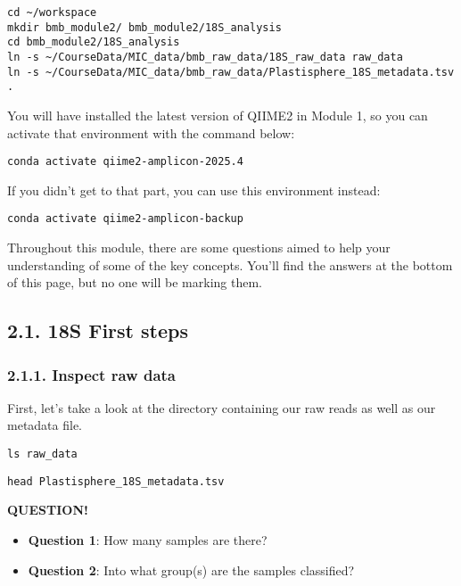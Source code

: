 \documentclass[
]{book}
\providecommand{\tightlist}{%
  \setlength{\itemsep}{0pt}\setlength{\parskip}{0pt}}
\newenvironment{bluebox}{
  \definecolor{shadecolor}{RGB}{172, 210, 237}
  \color{white}
  \begin{shaded}}
 {\end{shaded}}
\begin{document}
\begin{verbatim}
cd ~/workspace
mkdir bmb_module2/ bmb_module2/18S_analysis
cd bmb_module2/18S_analysis
ln -s ~/CourseData/MIC_data/bmb_raw_data/18S_raw_data raw_data
ln -s ~/CourseData/MIC_data/bmb_raw_data/Plastisphere_18S_metadata.tsv .
\end{verbatim}

You will have installed the latest version of QIIME2 in Module 1, so you can activate that environment with the command below:

\begin{verbatim}
conda activate qiime2-amplicon-2025.4
\end{verbatim}

If you didn't get to that part, you can use this environment instead:

\begin{verbatim}
conda activate qiime2-amplicon-backup
\end{verbatim}

Throughout this module, there are some questions aimed to help your understanding of some of the key concepts. You'll find the answers at the bottom of this page, but no one will be marking them.

\subsection{2.1. 18S First steps}\label{s-first-steps-1}

\subsubsection{2.1.1. Inspect raw data}\label{inspect-raw-data-1}

First, let's take a look at the directory containing our raw reads as well as our metadata file.

\begin{verbatim}
ls raw_data
\end{verbatim}

\begin{verbatim}
head Plastisphere_18S_metadata.tsv
\end{verbatim}

\begin{bluebox}

\begin{center}
\textbf{QUESTION!}

\end{center}

\begin{itemize}
\tightlist
\item
  \textbf{Question 1}: How many samples are there?
\item
  \textbf{Question 2}: Into what group(s) are the samples classified?
\end{itemize}

\end{bluebox}
\end{document}
